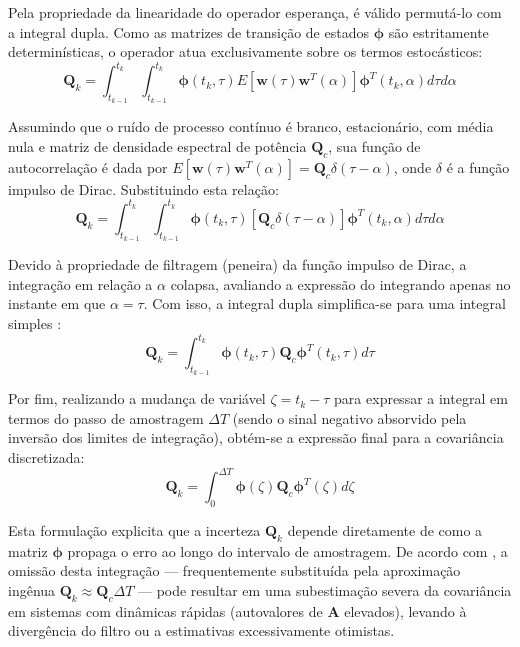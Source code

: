 \documentclass[a4paper,12pt]{article}
\begin{document}
Pela propriedade da linearidade do operador esperança, é válido permutá-lo com a integral dupla. Como as matrizes de transição de estados $\mathbf{\phi}$ são estritamente determinísticas, o operador atua exclusivamente sobre os termos estocásticos:
\begin{equation}
    \mathbf{Q}_k = \int_{t_{k-1}}^{t_{k}} \int_{t_{k-1}}^{t_{k}} \mathbf{\phi}(t_{k}, \tau) E\left[\mathbf{w}(\tau) \mathbf{w}^T(\alpha)\right] \mathbf{\phi}^T(t_{k}, \alpha) d\tau d\alpha
\end{equation}

Assumindo que o ruído de processo contínuo é branco, estacionário, com média nula e matriz de densidade espectral de potência $\mathbf{Q}_c$, sua função de autocorrelação é dada por $E[\mathbf{w}(\tau)\mathbf{w}^T(\alpha)] = \mathbf{Q}_c \delta(\tau - \alpha)$, onde $\delta$ é a função impulso de Dirac. Substituindo esta relação:
\begin{equation}
    \mathbf{Q}_k = \int_{t_{k-1}}^{t_{k}} \int_{t_{k-1}}^{t_{k}} \mathbf{\phi}(t_{k}, \tau) \left[\mathbf{Q}_c \delta(\tau-\alpha)\right] \mathbf{\phi}^T(t_{k}, \alpha) d\tau d\alpha
\end{equation}

Devido à propriedade de filtragem (peneira) da função impulso de Dirac, a integração em relação a $\alpha$ colapsa, avaliando a expressão do integrando apenas no instante em que $\alpha = \tau$. Com isso, a integral dupla simplifica-se para uma integral simples \cite{brown2012}:
\begin{equation}
    \mathbf{Q}_k = \int_{t_{k-1}}^{t_{k}} \mathbf{\phi}(t_{k}, \tau) \mathbf{Q}_c \mathbf{\phi}^T(t_{k}, \tau) d\tau
\end{equation}

Por fim, realizando a mudança de variável $\zeta = t_k - \tau$ para expressar a integral em termos do passo de amostragem $\Delta T$ (sendo o sinal negativo absorvido pela inversão dos limites de integração), obtém-se a expressão final para a covariância discretizada:
\begin{equation}
    \mathbf{Q}_k = \int_{0}^{\Delta T} \mathbf{\phi}(\zeta) \mathbf{Q}_c \mathbf{\phi}^T(\zeta) d\zeta
    \label{eq:Qk_integral_final}
\end{equation}

Esta formulação explicita que a incerteza $\mathbf{Q}_k$ depende diretamente de como a matriz $\mathbf{\phi}$ propaga o erro ao longo do intervalo de amostragem. De acordo com , a omissão desta integração — frequentemente substituída pela aproximação ingênua $\mathbf{Q}_k \approx \mathbf{Q}_c \Delta T$ — pode resultar em uma subestimação severa da covariância em sistemas com dinâmicas rápidas (autovalores de $\mathbf{A}$ elevados), levando à divergência do filtro ou a estimativas excessivamente otimistas.
\end{document}
